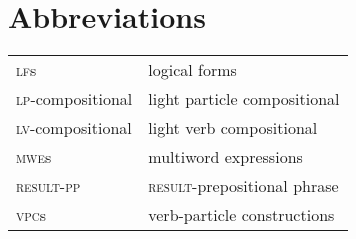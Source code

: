 \documentclass[output=paper
,modfonts
,nonflat]{langsci/langscibook}
\begin{document}
\section*{Abbreviations}

\begin{tabularx}{.96\textwidth}{ll}
\textsc{lf}s & logical forms  \\\textsc{lp}-compositional  & light particle compositional  \\
\textsc{lv}-compositional & light verb compositional   \\
\textsc{mwe}s & multiword expressions  \\
\textsc{result-pp} & \textsc{result}-prepositional phrase  \\
\textsc{vpc}s & verb-particle constructions \\
\end{tabularx}



{\sloppy
\printbibliography[heading=subbibliography,notkeyword=this]
}
\end{document}
